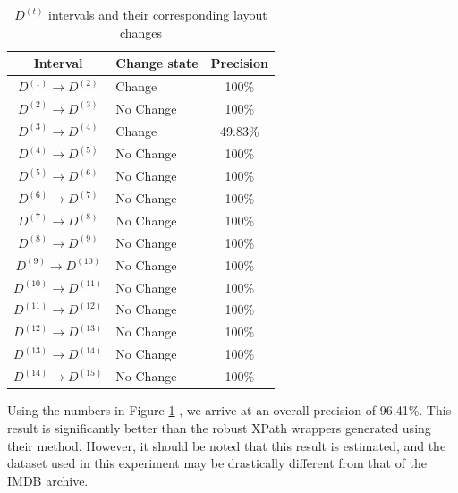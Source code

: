 \begin{table}
\centering
\small
\begin{tabular}{|c|l|c|}
\hline
	Interval			  & Change state & Precision \\
\hline
	$D^{(1)} \to D^{(2)}$ & Change		& 100\%\\
	$D^{(2)} \to D^{(3)}$ & No Change 	& 100\%\\
	$D^{(3)} \to D^{(4)}$ & Change 		& 49.83\%\\
	$D^{(4)} \to D^{(5)}$ & No Change 	& 100\%\\
	$D^{(5)} \to D^{(6)}$ & No Change 	& 100\%\\
	$D^{(6)} \to D^{(7)}$ & No Change 	& 100\%\\
	$D^{(7)} \to D^{(8)}$ & No Change 	& 100\%\\
	$D^{(8)} \to D^{(9)}$ & No Change 	& 100\%\\
	$D^{(9)} \to D^{(10)}$ & No Change 	& 100\%\\
	$D^{(10)} \to D^{(11)}$ & No Change 	& 100\%\\
	$D^{(11)} \to D^{(12)}$ & No Change 	& 100\%\\
	$D^{(12)} \to D^{(13)}$ & No Change 	& 100\%\\
	$D^{(13)} \to D^{(14)}$ & No Change 	& 100\%\\
	$D^{(14)} \to D^{(15)}$ & No Change 	& 100\%\\
\hline 
\end{tabular}
\caption{$D^{(t)}$ intervals and their corresponding layout changes}
\label{tab:dalvicomp}
\end{table}

Using the numbers in Figure \ref{tab:dalvicomp} , we arrive at an overall precision of 96.41\%. This result
is significantly better than the robust XPath wrappers generated using their method. However,
it should be noted that this result is estimated, and the dataset used in this experiment may
be drastically different from that of the IMDB archive.
